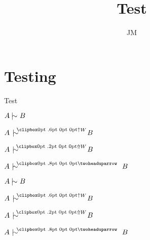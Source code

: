 \documentclass[]{article}
\title{Test}
\author{JM}
\begin{document}
\maketitle


\section{Testing}


Test

 $A \nmc B$

$ A \qmc{W}  B $

$ A \mrc{W} B $

$A \smc B$

{\LARGE 
 $A \nmc B$
 
 $ A \qmc{W}  B $
 
 $ A \mrc{W} B $
 
 $A \smc B$
 }
\end{document}
